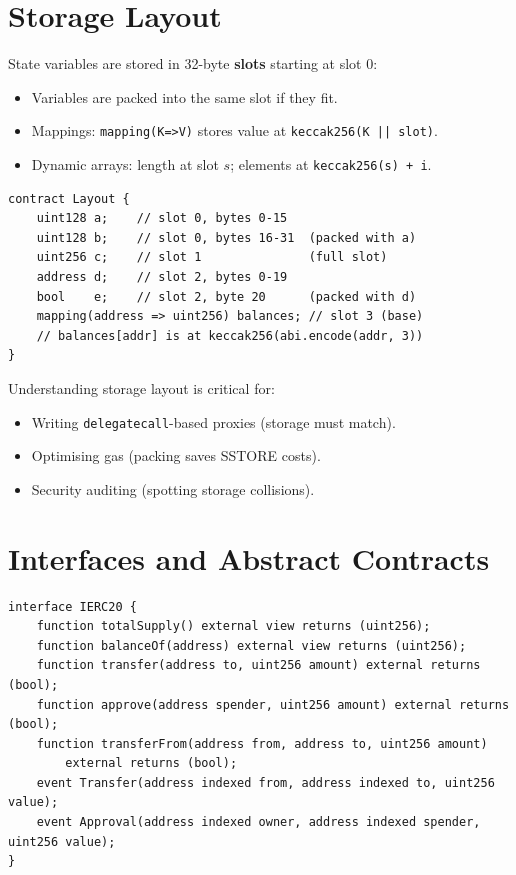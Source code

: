 \documentclass[12pt,a4paper,openany]{book}
\theoremstyle{definition}
\theoremstyle{plain}
\theoremstyle{remark}
\begin{document}
\section{Storage Layout}

State variables are stored in 32-byte \textbf{slots} starting at slot 0:
\begin{itemize}
  \item Variables are packed into the same slot if they fit.
  \item Mappings: \texttt{mapping(K=>V)} stores value at
        \texttt{keccak256(K\,||\,slot)}.
  \item Dynamic arrays: length at slot $s$; elements at
        \texttt{keccak256(s) + i}.
\end{itemize}

\begin{lstlisting}[language=Solidity,caption=Storage layout example]
contract Layout {
    uint128 a;    // slot 0, bytes 0-15
    uint128 b;    // slot 0, bytes 16-31  (packed with a)
    uint256 c;    // slot 1               (full slot)
    address d;    // slot 2, bytes 0-19
    bool    e;    // slot 2, byte 20      (packed with d)
    mapping(address => uint256) balances; // slot 3 (base)
    // balances[addr] is at keccak256(abi.encode(addr, 3))
}
\end{lstlisting}

Understanding storage layout is critical for:
\begin{itemize}
  \item Writing \texttt{delegatecall}-based proxies (storage must match).
  \item Optimising gas (packing saves SSTORE costs).
  \item Security auditing (spotting storage collisions).
\end{itemize}

\section{Interfaces and Abstract Contracts}

\begin{lstlisting}[language=Solidity,caption=Interface definition]
interface IERC20 {
    function totalSupply() external view returns (uint256);
    function balanceOf(address) external view returns (uint256);
    function transfer(address to, uint256 amount) external returns (bool);
    function approve(address spender, uint256 amount) external returns (bool);
    function transferFrom(address from, address to, uint256 amount)
        external returns (bool);
    event Transfer(address indexed from, address indexed to, uint256 value);
    event Approval(address indexed owner, address indexed spender, uint256 value);
}
\end{lstlisting}
\end{document}
